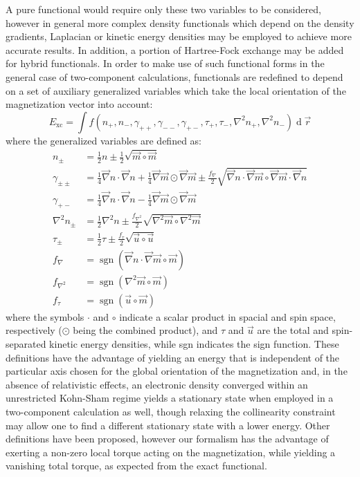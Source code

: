 \documentclass[12pt]{article}
\renewcommand{\d}{\operatorname{d}}
\begin{document}
A pure functional would require only these two variables to be considered, however in general more complex density functionals which depend on the density gradients, Laplacian or kinetic energy densities may be employed to achieve more accurate results.
In addition, a portion of Hartree-Fock exchange may be added for hybrid functionals.
In order to make use of such functional forms in the general case of two-component calculations, functionals are redefined to depend on a set of auxiliary generalized variables which take the local orientation of the magnetization vector into account:\cite{Frisch12_2193}
\begin{equation}
\label{eq:Exc}
 E_\mathrm{xc} = \int f(n_+,n_-,\gamma_{++},\gamma_{--},\gamma_{+-},\tau_+,\tau_-,\nabla^2n_+,\nabla^2n_-)\d\vec{r}
\end{equation}
where the generalized variables are defined as:\cite{Frisch07_125119,Frisch12_2193,Scuseria13_035117}
\begin{equation}
\label{eq:Uvar}
\begin{split}
 n_{\pm} &= \frac{1}{2}n \pm \frac{1}{2}\sqrt{\vec{m}\circ\vec{m}} \\
 \gamma_{\pm\pm} &= \frac{1}{4}\vec{\nabla}n\cdot\vec{\nabla}n + \frac{1}{4}\vec{\nabla}\vec{m}\odot\vec{\nabla}\vec{m}
  \pm \frac{f_\nabla}{2}\sqrt{\vec{\nabla}n\cdot\vec{\nabla}\vec{m}\circ\vec{\nabla}\vec{m}\cdot\vec{\nabla}n} \\
 \gamma_{+-}     &= \frac{1}{4}\vec{\nabla}n\cdot\vec{\nabla}n - \frac{1}{4}\vec{\nabla}\vec{m}\odot\vec{\nabla}\vec{m} \\
 \nabla^2n_{\pm} &= \frac{1}{2}\nabla^2n \pm \frac{f_{\nabla^2}}{2}\sqrt{\nabla^2\vec{m}\circ\nabla^2\vec{m}} \\
 \tau_{\pm} &= \frac{1}{2}\tau \pm \frac{f_\tau}{2}\sqrt{\vec{u}\circ\vec{u}} \\
 f_\nabla &= \operatorname{sgn}(\vec{\nabla}n\cdot\vec{\nabla}\vec{m}\circ\vec{m}) \\
 f_{\nabla^2} &= \operatorname{sgn}(\nabla^2\vec{m}\circ\vec{m}) \\
 f_\tau &= \operatorname{sgn}(\vec{u}\circ\vec{m})
\end{split}
\end{equation}
where the symbols $\cdot$ and $\circ$ indicate a scalar product in spacial and spin space, respectively ($\odot$ being the combined product), and $\tau$ and $\vec{u}$ are the total and spin-separated kinetic energy densities, while sgn indicates the sign function.
These definitions have the advantage of yielding an energy that is independent of the particular axis chosen for the global orientation of the magnetization and, in the absence of relativistic effects, an electronic density converged within an unrestricted Kohn-Sham regime yields a stationary state when employed in a two-component calculation as well, though relaxing the collinearity constraint may allow one to find a different stationary state with a lower energy.
Other definitions have been proposed,\cite{Liu04_6658,Liu05_241102,Liu03_597,Liu05_054102} however our formalism has the advantage of exerting a non-zero local torque acting on the magnetization, while yielding a vanishing total torque,
as expected from the exact functional.\cite{Gyorffy01_206403}
\end{document}
